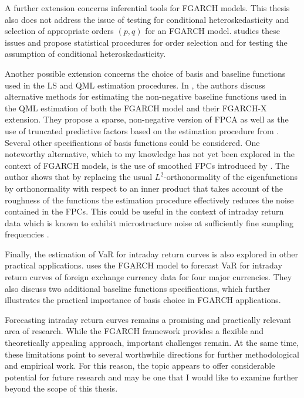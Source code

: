 \documentclass[12pt,a4paper]{article}
\theoremstyle{definition}
\begin{document}
A further extension concerns inferential tools for FGARCH models. This thesis also does not address the issue of testing for conditional heteroskedasticity and selection of appropriate orders $(p,q)$ for an FGARCH model. \citet{FHeteroTests} studies these issues and propose statistical procedures for order selection and for testing the assumption of conditional heteroskedasticity.

Another possible extension concerns the choice of basis and baseline functions used in the LS and QML estimation procedures. In \citet{FGARCHX}, the authors discuss alternative methods for estimating the non-negative baseline functions used in the QML estimation of both the FGARCH model and their FGARCH-X extension. They propose a sparse, non-negative version of FPCA as well as the use of truncated predictive factors based on the estimation procedure from \citet{KARGIN20082508}. Several other specifications of basis functions could be considered. One noteworthy alternative, which to my knowledge has not yet been explored in the context of FGARCH models, is the use of smoothed FPCs introduced by \citet{silverman1996smoothed}. The author shows that by replacing the usual $L^2$-orthonormality of the eigenfunctions by orthonormality with respect to an inner product that takes account of the roughness of the functions the estimation procedure effectively reduces the noise contained in the FPCs. This could be useful in the context of intraday return data which is known to exhibit microstructure noise at sufficiently fine sampling frequencies \citep{Cerovecki2019}.

Finally, the estimation of VaR for intraday return curves is also explored in other practical applications. \citet{kearney2025intradayfxvolatilitycurveforecasting} uses the FGARCH model to forecast VaR for intraday return curves of foreign exchange currency data for four major currencies. They also discuss two additional baseline functions specifications, which further illustrates the practical importance of basis choice in FGARCH applications.

Forecasting intraday return curves remains a promising and practically relevant area of research. While the FGARCH framework provides a flexible and theoretically appealing approach, important challenges remain. At the same time, these limitations point to several worthwhile directions for further methodological and empirical work. For this reason, the topic appears to offer considerable potential for future research and may be one that I would like to examine further beyond the scope of this thesis.
\newpage
{


}
\end{document}
